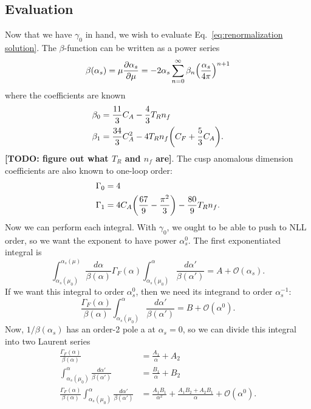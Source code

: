 \documentclass[11pt,twoside,reqno]{amsart}
\theoremstyle{plain}
\theoremstyle{remark}
\theoremstyle{definition}
\theoremstyle{remark}
\theoremstyle{definition}
\theoremstyle{definition}
\newcommand{\cO}{\mathcal{O}}
\begin{document}
\subsection{Evaluation}
	Now that we have $\gamma_0$ in hand, we wish to evaluate Eq.~\ref{eq:renormalization solution}. The $\beta$-function can be written as a power series
	\begin{equation}
		\beta(\alpha_s) = \mu\frac{\partial \alpha_s}{\partial\mu} = -2\alpha_s \sum_{n = 0}^\infty \beta_n \qty(\frac{\alpha_s}{4\pi})^{n+1}
	\end{equation}
	where the coefficients are known \cite{frye_factorization_2016}
	\begin{equation}\label{eq:beta coefficients}
	\begin{aligned}
		\beta_0 &= \frac{11}{3}C_A - \frac{4}{3}T_R n_f \\
		\beta_1 &= \frac{34}{3}C_A^2 - 4T_Rn_f\qty(C_F + \frac{5}{3}C_A).
	\end{aligned}
	\end{equation}
	{\color{red}\textbf{[TODO: figure out what $T_R$ and $n_f$ are]}}. The cusp anomalous dimension coefficients are also known to one-loop order:
	\begin{equation}\label{eq:cusp coefficients}
	\begin{aligned}
		\Gamma_0 &= 4 \\
		\Gamma_1 &= 4C_A\qty(\frac{67}{9} - \frac{\pi^2}{3}) - \frac{80}{9}T_R n_f.
	\end{aligned}
	\end{equation}
	Now we can perform each integral. With $\gamma_0$, we ought to be able to push to NLL order, so we want the exponent to have power $\alpha_s^0$. The first exponentiated integral is
	\begin{equation}
		\int_{\alpha_s(\mu_0)}^{\alpha_s(\mu)} \frac{d\alpha}{\beta(\alpha)}\Gamma_F(\alpha)\int_{\alpha_s(\mu_0)}^\alpha \frac{d\alpha'}{\beta(\alpha')} = A + \cO(\alpha_s).
	\end{equation}
	If we want this integral to order $\alpha_s^0$, then we need its integrand to order $\alpha_s^{-1}$:
	\begin{equation}
		\frac{\Gamma_F(\alpha)}{\beta(\alpha)}\int_{\alpha_s(\mu_0)}^\alpha \frac{d\alpha'}{\beta(\alpha')} = B + \cO(\alpha^0).
	\end{equation}
	Now, $1/\beta(\alpha_s)$ has an order-2 pole a at $\alpha_s = 0$, so we can divide this integral into two Laurent series
	\begin{equation}
	\begin{aligned}
		\frac{\Gamma_F(\alpha)}{\beta(\alpha)} &= \frac{A_1}{\alpha} + A_2 \\
		\int_{\alpha_s(\mu_0)}^\alpha \frac{d\alpha'}{\beta(\alpha')} &= \frac{B_1}{\alpha} + B_2 \\
		\frac{\Gamma_F(\alpha)}{\beta(\alpha)}\int_{\alpha_s(\mu_0)}^\alpha \frac{d\alpha'}{\beta(\alpha')} &= \frac{A_1B_1}{\alpha^2} + \frac{A_1 B_2 + A_2 B_1}{\alpha} + \cO(\alpha^0).
	\end{aligned}
	\end{equation}
\end{document}
